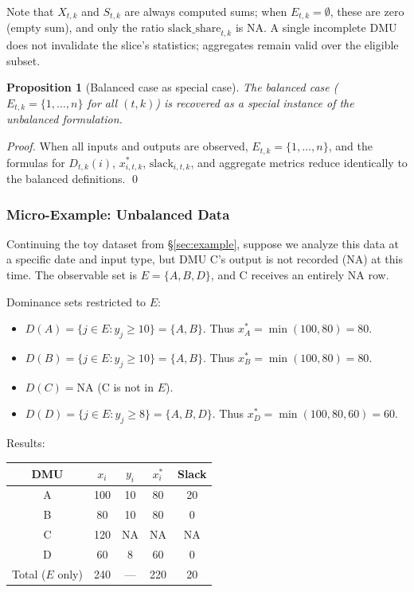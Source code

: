 \documentclass[11pt]{article}
\theoremstyle{definition}
\theoremstyle{plain}
\newtheorem{proposition}{Proposition}
\theoremstyle{remark}
\begin{document}
Note that $X_{t,k}$ and $S_{t,k}$ are always computed sums; when $E_{t,k} = \emptyset$, these are zero (empty sum), and only the ratio $\text{slack\_share}_{t,k}$ is NA. A single incomplete DMU does not invalidate the slice's statistics; aggregates remain valid over the eligible subset.

\begin{proposition}[Balanced case as special case]
The balanced case ($E_{t,k} = \{1,\ldots,n\}$ for all $(t,k)$) is recovered as a special instance of the unbalanced formulation.
\end{proposition}
\begin{proof}
When all inputs and outputs are observed, $E_{t,k} = \{1,\ldots,n\}$, and the formulas for $D_{t,k}(i)$, $x_{i,t,k}^*$, $\text{slack}_{i,t,k}$, and aggregate metrics reduce identically to the balanced definitions. \qed
\end{proof}

\subsubsection{Micro-Example: Unbalanced Data}

Continuing the toy dataset from \S\ref{sec:example}, suppose we analyze this data at a specific date and input type, but DMU C's output is not recorded (NA) at this time.
The observable set is $E = \{A, B, D\}$, and C receives an entirely NA row.

Dominance sets restricted to $E$:
\begin{itemize}
\item $D(A) = \{j \in E : y_j \ge 10\} = \{A, B\}$. Thus $x_A^* = \min(100, 80) = 80$.
\item $D(B) = \{j \in E : y_j \ge 10\} = \{A, B\}$. Thus $x_B^* = \min(100, 80) = 80$.
\item $D(C) = \text{NA}$ (C is not in $E$).
\item $D(D) = \{j \in E : y_j \ge 8\} = \{A, B, D\}$. Thus $x_D^* = \min(100, 80, 60) = 60$.
\end{itemize}

Results:
\begin{table}[h]
\centering
\begin{tabular}{ccccc}
\toprule
DMU & $x_i$ & $y_i$ & $x_i^*$ & Slack \\
\midrule
A & 100 & 10 & 80 & 20 \\
B & 80 & 10 & 80 & 0 \\
C & 120 & NA & NA & NA \\
D & 60 & 8 & 60 & 0 \\
\midrule
Total ($E$ only) & 240 & --- & 220 & 20 \\
\bottomrule
\end{tabular}
\end{table}
\end{document}
